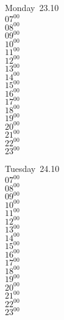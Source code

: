 \documentclass[11pt, a4paper]{book}\usepackage[]{graphicx}\usepackage[]{color}
\begin{document}
\begin{headerbox}
\end{headerbox}
\begin{weekdaybox}
  Monday~23.10\\
  { 
  \vfill
  $07^{00}$\\
$08^{00}$\\
$09^{00}$\\
$10^{00}$\\
$11^{00}$\\
$12^{00}$\\
$13^{00}$\\
$14^{00}$\\
$15^{00}$\\
$16^{00}$\\
$17^{00}$\\
$18^{00}$\\
$19^{00}$\\
$20^{00}$\\
$21^{00}$\\
$22^{00}$\\
$23^{00}$\\
  }
\end{weekdaybox}
\begin{weekdaybox}
  Tuesday~24.10\\
  { 
  \vfill
  $07^{00}$\\
$08^{00}$\\
$09^{00}$\\
$10^{00}$\\
$11^{00}$\\
$12^{00}$\\
$13^{00}$\\
$14^{00}$\\
$15^{00}$\\
$16^{00}$\\
$17^{00}$\\
$18^{00}$\\
$19^{00}$\\
$20^{00}$\\
$21^{00}$\\
$22^{00}$\\
$23^{00}$\\
  }
\end{weekdaybox}
\end{document}
